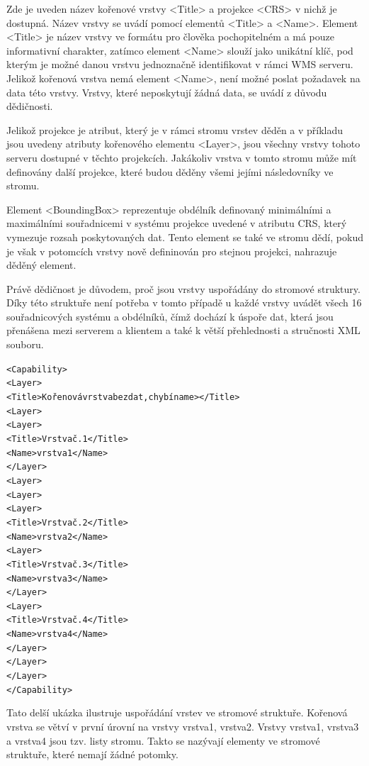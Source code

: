 \documentclass[a4paper,12pt]{article}
\begin{document}
Zde je uveden název kořenové vrstvy <Title> a projekce <CRS> v nichž
je dostupná. Název vrstvy se uvádí pomocí elementů <Title> a
<Name>. Element <Title> je název vrstvy ve formátu pro člověka
pochopitelném a má pouze informativní charakter, zatímco element
<Name> slouží jako unikátní klíč, pod kterým je možné danou vrstvu
jednoznačně identifikovat v rámci WMS serveru. Jelikož kořenová vrstva
nemá element <Name>, není možné poslat požadavek na data této
vrstvy. Vrstvy, které neposkytují žádná data, se uvádí z důvodu
dědičnosti.

Jelikož projekce je atribut, který je v rámci stromu vrstev děděn a v
příkladu jsou uvedeny atributy kořenového elementu <Layer>, jsou
všechny vrstvy tohoto serveru dostupné v těchto projekcích.  Jakákoliv
vrstva v tomto stromu může mít definovány další projekce, které budou
děděny všemi jejími následovníky ve stromu.

Element <BoundingBox> reprezentuje obdélník definovaný minimálními a
maximálními souřadnicemi v systému projekce uvedené v atributu CRS,
který vymezuje rozsah poskytovaných dat.  Tento element se také ve
stromu dědí, pokud je však v potomcích vrstvy nově defininován pro
stejnou projekci, nahrazuje děděný element.

Právě dědičnost je důvodem, proč jsou vrstvy uspořádány do stromové
struktury. Díky této struktuře není potřeba v tomto případě u každé
vrstvy uvádět všech 16 souřadnicových systému a obdélníků, čímž
dochází k úspoře dat, která jsou přenášena mezi serverem a klientem a
také k větší přehlednosti a stručnosti XML souboru.

\newpage

\begin{alltt}\footnotesize
<Capability>
  <Layer>
    <Title>Kořenová vrstva bez dat, chybí name></Title>
    <Layer>
      <Layer>
        <Title>Vrstva č. 1</Title>
        <Name>vrstva1</Name>
      </Layer>
    <Layer>
    <Layer>
      <Layer>
        <Title>Vrstva č. 2</Title>
        <Name>vrstva2</Name>
        <Layer>
          <Title>Vrstva č. 3</Title>
          <Name>vrstva3</Name>
        </Layer>
        <Layer>
          <Title>Vrstva č. 4</Title>
          <Name>vrstva4</Name>
        </Layer>
      </Layer>
    </Layer>
</Capability>
\end{alltt}

Tato delší ukázka ilustruje uspořádání vrstev ve stromové
struktuře. Kořenová vrstva se větví v první úrovní na vrstvy vrstva1,
vrstva2. Vrstvy vrstva1, vrstva3 a vrstva4 jsou tzv. listy
stromu. Takto se nazývají elementy ve stromové struktuře, které nemají
žádné potomky.
\end{document}
